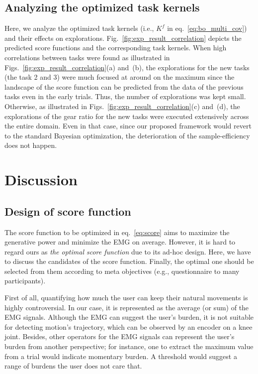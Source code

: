 \documentclass[twocolumn]{svjour3}          %
\begin{document}
\subsection{Analyzing the optimized task kernels}

Here, we analyze the optimized task kernels (i.e., $K^f$ in eq.~\eqref{eq:bo_multi_cov}) and their effects on explorations.
Fig.~\ref{fig:exp_result_correlation} depicts the predicted score functions and the corresponding task kernels.
When high correlations between tasks were found as illustrated in Figs.~\ref{fig:exp_result_correlation}(a) and~(b), the explorations for the new tasks (the task 2 and 3) were much focused at around on the maximum since the landscape of the score function can be predicted from the data of the previous tasks even in the early trials.
Thus, the number of explorations was kept small.
Otherwise, as illustrated in Figs.~\ref{fig:exp_result_correlation}(c) and~(d), the explorations of the gear ratio for the new tasks were executed extensively across the entire domain.
Even in that case, since our proposed framework would revert to the standard Bayesian optimization, the deterioration of the sample-efficiency does not happen.

\section{Discussion}
\label{sec:discussion}

\subsection{Design of score function}

The score function to be optimized in eq.~\eqref{eq:score} aims to maximize the generative power and minimize the EMG on average.
However, it is hard to regard ours as \textit{the optimal score function} due to its ad-hoc design.
Here, we have to discuss the candidates of the score function.
Finally, the optimal one should be selected from them according to meta objectives (e.g., questionnaire to many participants).

First of all, quantifying how much the user can keep their natural movements is highly controversial.
In our case, it is represented as the average (or sum) of the EMG signals.
Although the EMG can suggest the user's burden, it is not suitable for detecting motion's trajectory, which can be observed by an encoder on a knee joint.
Besides, other operators for the EMG signals can represent the user's burden from another perspective; for instance, one to extract the maximum value from a trial would indicate momentary burden. A threshold would suggest a range of burdens the user does not care that.
\end{document}
